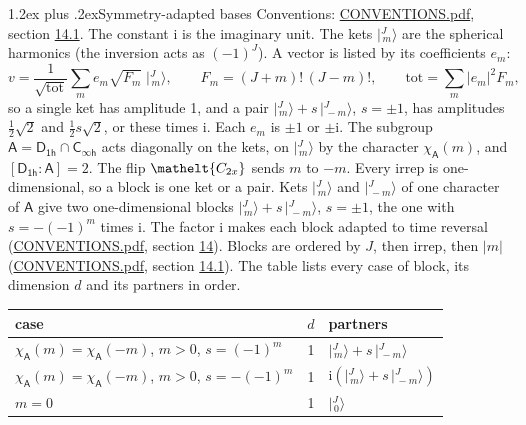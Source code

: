 \documentclass[10pt,a4paper]{article}
\makeatletter
\renewcommand\section{\@startsection{section}{1}{\z@}{-3ex plus -1ex minus -.2ex}%
  {1.2ex plus .2ex}{\normalfont\large\sffamily\bfseries\color{parttitle}}}
\numberwithin{equation}{section}
\newcommand{\eltfont}[1]{{\let\sigma\eltsigma\mathelt{#1}}}
\newcommand{\grp}[1]{\mathsf{#1}}
\newcommand{\elt}[1]{\eltfont{#1}}
\newcommand{\grpindex}[2]{[#1 : #2]}
\newcommand{\iunit}{\mathrm{i}}
\newcommand{\chiA}{\chi_{\grp{A}}}
\newcommand{\jm}[2]{\bigl\lvert{}^{#1}_{\,#2}\bigr\rangle}
\makeatother
\begin{document}
\section{Symmetry-adapted bases}\label{s:bases}
Conventions: \href{../../CONVENTIONS.pdf}{CONVENTIONS.pdf}, section \href{../../CONVENTIONS.pdf\#conv.14.1}{14.1}.
The constant $\iunit$ is the imaginary unit.
\leavevmode\label{n:index.m}\label{n:vector.ket}The kets $\jm{J}{m}$ are the spherical harmonics (the inversion acts as $(-1)^J$). \label{n:index.ketcoefficient}\label{n:vector.basis.symmetry}\label{n:index.ketweight}\label{n:index.total}A vector is listed by its coefficients $e_m$:
\begin{equation}\label{e:ket}v = \frac{1}{\sqrt{\mathrm{tot}}}\sum_m e_m\sqrt{F_m}\;\jm{J}{m},\qquad F_m = (J+m)!\,(J-m)!,\qquad \mathrm{tot} = \sum_m |e_m|^2F_m,\end{equation}
\leavevmode\label{n:index.pair.sign}so a single ket has amplitude 1, and a pair $\jm{J}{m} + s\,\jm{J}{-m}$, $s = \pm1$, has amplitudes $\tfrac{1}{2}\sqrt{2}$ and $\tfrac{1}{2}s\sqrt{2}$, or these times $\iunit$. Each $e_m$ is $\pm1$ or $\pm\iunit$.
\leavevmode\label{n:group.A}\label{n:function.character.abelian}The subgroup $\grp{A} = \grp{D_{1h}}\cap\grp{C_{\infty h}}$ acts diagonally on the kets, on $\jm{J}{m}$ by the character $\chiA(m)$, and $\grpindex{\grp{D_{1h}}}{\grp{A}} = 2$. The flip $\elt{C_{2x}}$ sends $m$ to $-m$. Every irrep is one-dimensional, so a block is one ket or a pair. Kets $\jm{J}{m}$ and $\jm{J}{-m}$ of one character of $\grp{A}$ give two one-dimensional blocks $\jm{J}{m} + s\,\jm{J}{-m}$, $s = \pm1$, the one with $s = -(-1)^m$ times $\iunit$. The factor $\iunit$ makes each block adapted to time reversal (\href{../../CONVENTIONS.pdf}{CONVENTIONS.pdf}, section \href{../../CONVENTIONS.pdf\#conv.14}{14}). Blocks are ordered by $J$, then irrep, then $|m|$ (\href{../../CONVENTIONS.pdf}{CONVENTIONS.pdf}, section \href{../../CONVENTIONS.pdf\#conv.14.1}{14.1}).
\leavevmode\label{n:head.case}\label{n:head.partners}The table lists every case of block, its dimension $d$ and its partners in order.
\begin{center}\begin{tabular}{@{}lrl@{}}\toprule
case & $d$ & partners\\\midrule
$\chiA(m) = \chiA(-m)$, $m > 0$, $s = (-1)^m$ & 1 & $\jm{J}{m} + s\,\jm{J}{-m}$\\
$\chiA(m) = \chiA(-m)$, $m > 0$, $s = -(-1)^m$ & 1 & $\iunit(\jm{J}{m} + s\,\jm{J}{-m})$\\
$m = 0$ & 1 & $\jm{J}{0}$\\
\bottomrule\end{tabular}\end{center}
\end{document}
